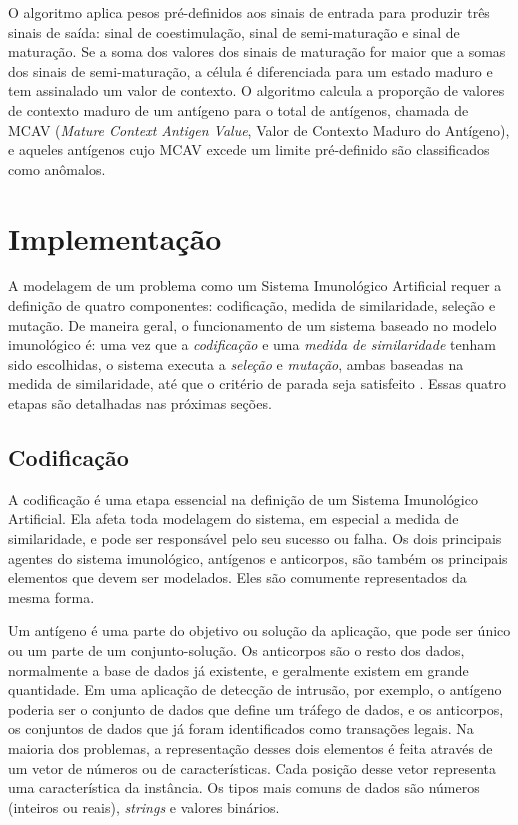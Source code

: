 O algoritmo aplica pesos pré-definidos aos sinais de entrada para produzir três sinais de saída: sinal de coestimulação, sinal de semi-maturação e sinal de maturação. Se a soma dos valores dos sinais de maturação for maior que a somas dos sinais de semi-maturação, a célula é diferenciada para um estado maduro e tem assinalado um valor de contexto. O algoritmo calcula a proporção de valores de contexto maduro de um antígeno para o total de antígenos, chamada de MCAV (\emph{Mature Context Antigen Value}, Valor de Contexto Maduro do Antígeno), e aqueles antígenos cujo MCAV excede um limite pré-definido são classificados como anômalos.

\section{Implementação}

A modelagem de um problema como um Sistema Imunológico Artificial requer a definição de quatro componentes: codificação, medida de similaridade, seleção e mutação. De maneira geral, o funcionamento de um sistema baseado no modelo imunológico é: uma vez que a \emph{codificação} e uma \emph{medida de similaridade} tenham sido escolhidas, o sistema executa a \emph{seleção} e \emph{mutação}, ambas baseadas na medida de similaridade, até que o critério de parada seja satisfeito \cite{Aickelin2005}. Essas quatro etapas são detalhadas nas próximas seções.

\subsection{Codificação}

A codificação é uma etapa essencial na definição de um Sistema Imunológico Artificial. Ela afeta toda modelagem do sistema, em especial a medida de similaridade, e pode ser responsável pelo seu sucesso ou falha. Os dois principais agentes do sistema imunológico, antígenos e anticorpos, são também os principais elementos que devem ser modelados. Eles são comumente representados da mesma forma.

Um antígeno é uma parte do objetivo ou solução da aplicação, que pode ser único ou um parte de um conjunto-solução. Os anticorpos são o resto dos dados, normalmente a base de dados já existente, e geralmente existem em grande quantidade. Em uma aplicação de detecção de intrusão, por exemplo, o antígeno poderia ser o conjunto de dados que define um tráfego de dados, e os anticorpos, os conjuntos de dados que já foram identificados como transações legais. Na maioria dos problemas, a representação desses dois elementos é feita através de um vetor de números ou de características. Cada posição desse vetor representa uma característica da instância. Os tipos mais comuns de dados são números (inteiros ou reais), \emph{strings} e valores binários.

